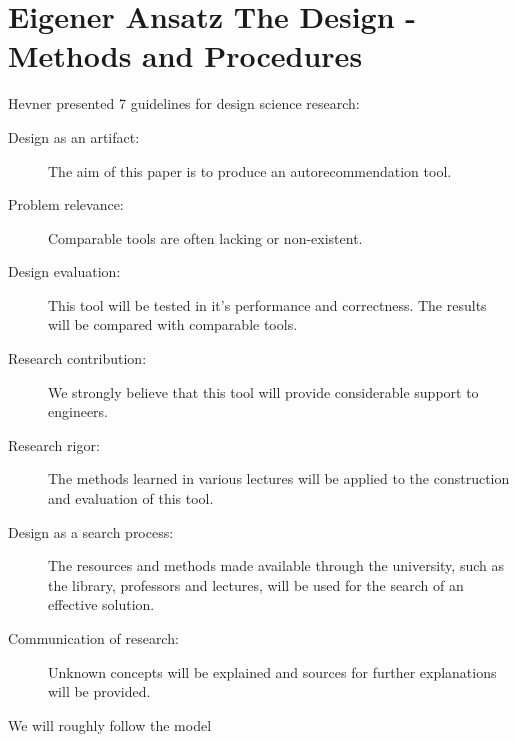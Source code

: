 \documentclass[10pt,a4paper,oneside]{scrartcl}
\begin{document}
	\section{
		{Eigener Ansatz}
		{The Design - Methods and Procedures}}
	\label{sec:approach}
	Hevner presented 7 guidelines for design science research:
	\begin{description}
		\item[Design as an artifact:] The aim of this paper is to produce an autorecommendation tool.
		\item [Problem relevance:] Comparable tools are often lacking or non-existent.
		\item [Design evaluation:] This tool will be tested in it's performance and correctness. The results will be compared with comparable tools.
		\item [Research contribution:] We strongly believe that this tool will provide considerable support to engineers.
		\item [Research rigor:] The methods learned in various lectures will be applied to the construction and evaluation of this tool.
		\item [Design as a search process:] The resources and methods made available through the university, such as the library, professors and lectures, will be used for the search of an effective solution.
		\item [Communication of research:] Unknown concepts will be explained and sources for further explanations will be provided. 
	\end{description}
	
	We will roughly follow the model 
\end{document}

